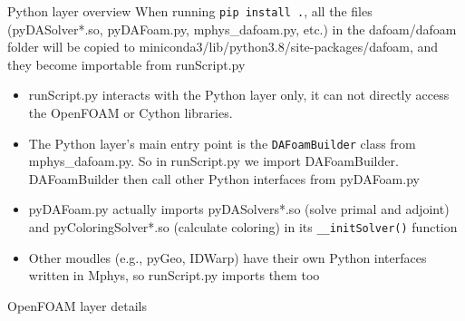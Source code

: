 \documentclass{bredelebeamer}
\begin{document}
\begin{frame}[fragile]{Python layer overview}
When running \texttt{pip install .}, all the files (pyDASolver*.so, pyDAFoam.py, mphys\_dafoam.py, etc.) in the dafoam/dafoam folder will be copied to miniconda3/lib/python3.8/site-packages/dafoam, and they become importable from runScript.py

\begin{itemize}
  \setlength\itemsep{1em}
    \item runScript.py interacts with the Python layer only, it can not directly access the OpenFOAM or Cython libraries.
    \item The Python layer's main entry point is the \texttt{DAFoamBuilder} class from mphys\_dafoam.py. So in runScript.py we import DAFoamBuilder. DAFoamBuilder then call other Python interfaces from pyDAFoam.py
    \item pyDAFoam.py actually imports pyDASolvers*.so (solve primal and adjoint) and pyColoringSolver*.so (calculate coloring) in its \texttt{\_\_initSolver()} function
    \item Other moudles (e.g., pyGeo, IDWarp) have their own Python interfaces written in Mphys, so runScript.py imports them too  
  \end{itemize}
\end{frame}

\begin{frame}{}
  \center \Large OpenFOAM layer details
\end{frame}
\end{document}

